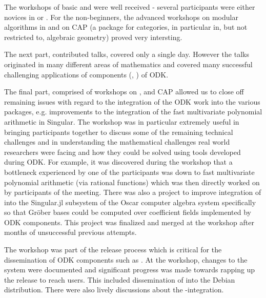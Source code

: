 \begin{event}
The workshops of basic \Singular and \GAP were well received - several 
participants were either novices in \GAP or \Singular.
For the non-beginners, the advanced workshops on modular algorithms in 
\Singular and on CAP (a \GAP package for categories, in particular in,
but not restricted to, algebraic geometry) proved very intersting.

The next part, contributed talks, covered only a single day. However
the talks originated in  many different areas of mathematics and covered
many successful challenging applications of components (\GAP, \Singular)
of ODK.

The final part, comprised of workshops on \GAP, \Singular and CAP
allowed us to close off remaining issues with regard     
to the integration of the ODK work into the various packages, e.g.              
improvements to the integration of the fast multivariate polynomial             
arithmetic in Singular. The workshop was in particular extremely useful in      
bringing participants together to discuss some of the remaining technical       
challenges and in understanding the mathematical challenges real world          
researchers were facing and how they could be solved using tools developed      
during ODK. For example, it was discovered during the workshop that a           
bottleneck experienced by one of the participants was down to fast              
multivariate polynomial arithmetic (via rational functions) which was then      
directly worked on by participants of the meeting. There was also a project     
to improve integration of \Singular into the Singular.jl
 subsystem of the        
Oscar computer algebra system specifically so that Gr\"{o}ber bases could       
be computed over coefficient fields implemented by ODK components. This         
project was finalized and merged at the workshop after months of                
unsuccessful previous attempts.

The \GAP workshop was part of the  release process which is critical
for the dissemination of ODK components such as \libGAP. At the workshop,
changes to the \libGAP system were documented and significant progress was
made towards rapping up the release to reach users. This included
dissemination of \GAP into the Debian distribution. There were also lively
discussions about the \GAP-\Jupyter integration.



\end{event}
